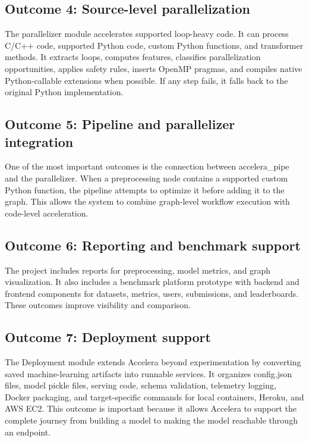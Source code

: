 \documentclass[12pt,a4paper]{report}
\begin{document}
\subsection*{Outcome 4: Source-level parallelization}

The parallelizer module accelerates supported loop-heavy code. It can
process C/C++ code, supported Python code, custom Python functions, and
transformer methods. It extracts loops, computes features, classifies
parallelization opportunities, applies safety rules, inserts OpenMP pragmas, and
compiles native Python-callable extensions when possible. If any step fails, it
falls back to the original Python implementation.

\subsection*{Outcome 5: Pipeline and parallelizer integration}

One of the most important outcomes is the connection between
accelera\_pipe and the parallelizer. When a preprocessing node
contains a supported custom Python function, the pipeline attempts to optimize
it before adding it to the graph. This allows the system to combine graph-level
workflow execution with code-level acceleration.

\subsection*{Outcome 6: Reporting and benchmark support}

The project includes reports for preprocessing, model metrics, and graph
visualization. It also includes a benchmark platform prototype with backend and
frontend components for datasets, metrics, users, submissions, and leaderboards.
These outcomes improve visibility and comparison.

\subsection*{Outcome 7: Deployment support}

The Deployment module extends Accelera beyond experimentation by converting
saved machine-learning artifacts into runnable services. It organizes
config.json files, model pickle files, serving code, schema
validation, telemetry logging, Docker packaging, and target-specific commands
for local containers, Heroku, and AWS EC2. This outcome is important because it
allows Accelera to support the complete journey from building a model to making
the model reachable through an endpoint.
\end{document}
